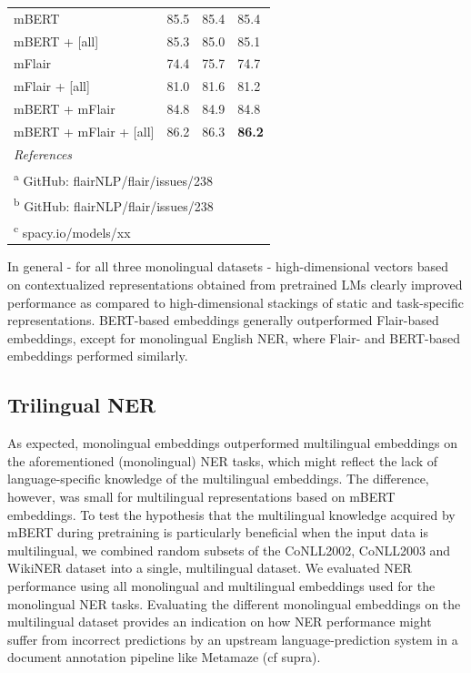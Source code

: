 \documentclass[12pt,a4paper,]{book}
\begin{document}
\begin{table}
\begin{tabular}[t]{llll}
\hspace{1em}mBERT & 85.5 & 85.4 & 85.4\\
\hspace{1em}mBERT + [all] & 85.3 & 85.0 & 85.1\\
\hspace{1em}mFlair & 74.4 & 75.7 & 74.7\\
\hspace{1em}mFlair + [all] & 81.0 & 81.6 & 81.2\\
\hspace{1em}mBERT + mFlair & 84.8 & 84.9 & 84.8\\
\hspace{1em}mBERT + mFlair + [all] & 86.2 & 86.3 & \textbf{86.2}\\
\bottomrule
\multicolumn{4}{l}{\textit{References}}\\
\multicolumn{4}{l}{\textsuperscript{a} GitHub: flairNLP/flair/issues/238}\\
\multicolumn{4}{l}{\textsuperscript{b} GitHub: flairNLP/flair/issues/238}\\
\multicolumn{4}{l}{\textsuperscript{c} spacy.io/models/xx}\\
\end{tabular}
\end{table}



In general - for all three monolingual datasets - high-dimensional vectors based on contextualized representations obtained from pretrained LMs clearly improved performance as compared to high-dimensional stackings of static and task-specific representations. BERT-based embeddings generally outperformed Flair-based embeddings, except for monolingual English NER, where Flair- and BERT-based embeddings performed similarly.

\hypertarget{trilingual-ner}{%
\subsection{Trilingual NER}\label{trilingual-ner}}

As expected, monolingual embeddings outperformed multilingual embeddings on the aforementioned (monolingual) NER tasks, which might reflect the lack of language-specific knowledge of the multilingual embeddings. The difference, however, was small for multilingual representations based on mBERT embeddings. To test the hypothesis that the multilingual knowledge acquired by mBERT during pretraining is particularly beneficial when the input data is multilingual, we combined random subsets of the CoNLL2002, CoNLL2003 and WikiNER dataset into a single, multilingual dataset. We evaluated NER performance using all monolingual and multilingual embeddings used for the monolingual NER tasks. Evaluating the different monolingual embeddings on the multilingual dataset provides an indication on how NER performance might suffer from incorrect predictions by an upstream language-prediction system in a document annotation pipeline like Metamaze (cf supra).
\end{document}
